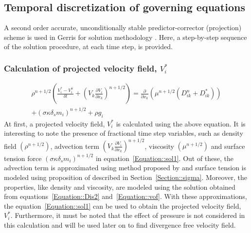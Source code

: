 \subsection{Temporal discretization of governing equations}
A second order accurate, unconditionally stable predictor-corrector (projection) scheme is used in Gerris for solution methodology \citep{Chorin1968}. Here, a step-by-step sequence of the solution procedure, at each time step, is provided.
\subsubsection{Calculation of projected velocity field, $V_i^*$}
\begin{eqnarray}\label{Equation::sol1}
\rho^{n+1/2}\left(\frac{V_i^* - V_i^{n}}{\delta t} + \left(V_k\frac{\partial V_i}{\partial x_k}\right)^{n+1/2}\right) = \frac{\partial}{\partial x_k}\left(\mu^{n+1/2}\left(D_{ik}^{n} + D_{ik}^*\right)\right)\nonumber\\ + (\sigma\kappa\delta_sm_i)^{n+1/2} + \rho g_i
\end{eqnarray}
At first, a projected velocity field, $V_i^*$ is calculated using the above equation. It is interesting to note the presence of fractional time step variables, such as density field $\left(\rho^{n+1/2}\right)$, advection term $\left(V_k\frac{\partial V_i}{\partial x_k}\right)^{n+1/2}$, viscosity $\left(\mu^{n+1/2}\right)$ and surface tension force $(\sigma\kappa\delta_sm_i)^{n+1/2}$ in equation~\ref{Equation::sol1}. Out of these, the advection term is approximated using method proposed by \citet{bell1989second} and surface tension is modeled using proposition of \citet{brackbill1992continuum} described in Section~\ref{Section::sigma}. Moreover, the properties, like density and viscosity, are modeled using the solution obtained from equations~\ref{Equation::Dis2} and~\ref{Equation::vof}. With these approximations, the equation~\ref{Equation::sol1} can be used to obtain the projected velocity field, $V_i^*$. Furthermore, it must be noted that the effect of pressure is not considered in this calculation and will be used later on to find divergence free velocity field. 

